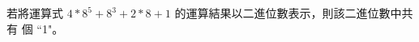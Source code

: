 \ifx\ntpcNinetyThree\undefined[93學年基北區] \fi
\label{ntpc-93-p34} 若將運算式 $4*8^5+8^3+2*8+1$ 的運算結果以二進位數表示，則該二進位數中共有 \underlineblank{\ref{ntpc-93-p34}} 個 ``1"。